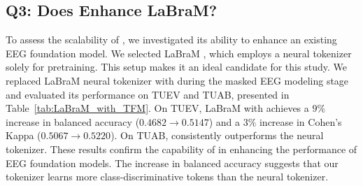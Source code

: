 \subsection{Q3: Does \tokenizer Enhance LaBraM?}

To assess the scalability of \tokenizer, we investigated its ability to enhance an existing EEG foundation model. We selected LaBraM \cite{jiang2024large}, which employs a neural tokenizer solely for pretraining. 
This setup makes it an ideal candidate for this study. We replaced LaBraM neural tokenizer with \tokenizer during the masked EEG modeling stage and evaluated its performance on TUEV and TUAB, presented in Table~\ref{tab:LaBraM_with_TFM}. On TUEV, LaBraM with \tokenizer achieves a $9\%$ increase in balanced accuracy ($0.4682 \rightarrow 0.5147$) and a $3\%$ increase in Cohen's Kappa ($0.5067 \rightarrow 0.5220$). 
On TUAB, \tokenizer consistently outperforms the neural tokenizer. 
These results confirm the capability of \method in enhancing the performance of EEG foundation models. The increase in balanced accuracy suggests that our tokenizer learns more class-discriminative tokens than the neural tokenizer.







